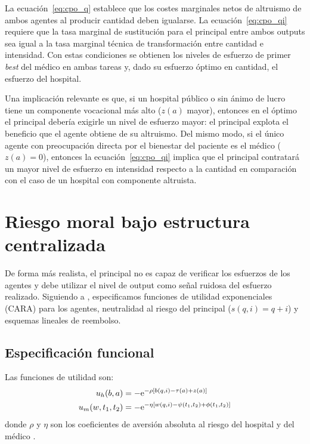 \begin{result}
La ecuación~\eqref{eq:cpo_q} establece que los costes marginales netos de altruismo de ambos agentes al producir cantidad deben igualarse. La ecuación~\eqref{eq:cpo_qi} requiere que la tasa marginal de sustitución para el principal entre ambos outputs sea igual a la tasa marginal técnica de transformación entre cantidad e intensidad. Con estas condiciones se obtienen los niveles de esfuerzo de primer \textit{best} del médico en ambas tareas y, dado su esfuerzo óptimo en cantidad, el esfuerzo del hospital.
\end{result}

Una implicación relevante es que, si un hospital público o sin ánimo de lucro tiene un componente vocacional más alto ($z(a)$ mayor), entonces en el óptimo el principal debería exigirle un nivel de esfuerzo mayor: el principal explota el beneficio que el agente obtiene de su altruismo. Del mismo modo, si el único agente con preocupación directa por el bienestar del paciente es el médico ($z(a)=0$), entonces la ecuación~\eqref{eq:cpo_qi} implica que el principal contratará un mayor nivel de esfuerzo en intensidad respecto a la cantidad en comparación con el caso de un hospital con componente altruista.


\section{Riesgo moral bajo estructura centralizada}
\label{sec:centralizada}

De forma más realista, el principal no es capaz de verificar los esfuerzos de los agentes y debe utilizar el nivel de output como señal ruidosa del esfuerzo realizado. Siguiendo a \citet{holmstrom1991}, especificamos funciones de utilidad exponenciales (CARA) para los agentes, neutralidad al riesgo del principal ($s(q,i)=q+i$) y esquemas lineales de reembolso.

\subsection{Especificación funcional}

Las funciones de utilidad son:
\begin{align}
  u_h(b,a) &= -\mathrm{e}^{-\rho[b(q,i)-\tau(a)+z(a)]} \label{eq:util_h_cara}\\
  u_m(w,t_1,t_2) &= -\mathrm{e}^{-\eta[w(q,i)-\psi(t_1,t_2)+\phi(t_1,t_2)]} \label{eq:util_m_cara}
\end{align}
donde $\rho$ y $\eta$ son los coeficientes de aversión absoluta al riesgo del hospital y del médico \citep{holmstrom1987}.

